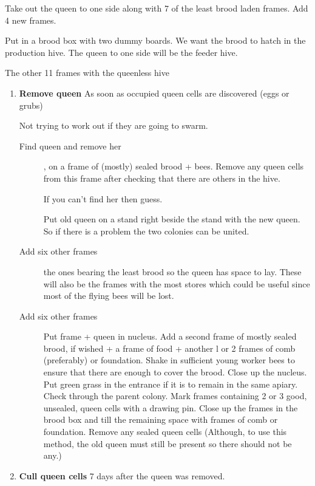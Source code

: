 Take out the queen to one side along with 7 of the least brood laden frames.  
Add 4 new frames.


Put in a brood box with two dummy boards.
We want the brood to hatch in the production hive.
The queen to one side will be the feeder hive.

The other 11 frames with the queenless hive

\begin{enumerate}

\item \textbf{Remove queen}
As soon as occupied queen cells are discovered (eggs or grubs)

Not trying to work out if they are going to swarm.

\begin{description}
  \item[Find queen and remove her], on a frame of (mostly) sealed brood + bees. Remove any queen cells from this frame after checking that there are others in the hive.

If you can't find her then guess.

Put old queen on a stand right beside the stand with the new queen.
So if there is a problem the two colonies can be united.

  \item[Add six other frames] the ones bearing the least brood so the queen has space to lay.
  These will also be the frames with the most stores which could be useful since most of the flying bees will be lost.
 
 
   \item[Add six other frames] 
  
Put frame + queen in nucleus.
Add a second frame of mostly sealed brood, if wished + a frame of food + another l or 2
frames of comb (preferably) or foundation.
Shake in sufficient young worker bees to ensure that there are enough to cover the brood.
Close up the nucleus. Put green grass in the entrance if it is to remain in the same apiary.
Check through the parent colony.  Mark frames containing 2 or 3 good, unsealed, queen cells with a drawing pin.
Close up the frames in the brood box and till the remaining space with frames of comb or foundation.
Remove any sealed queen cells (Although, to use this method, the old queen must still be present so there should not be any.)
 \end{description}
 
 
\item \textbf{Cull queen cells}
7 days after the queen was removed.


\end{enumerate}
